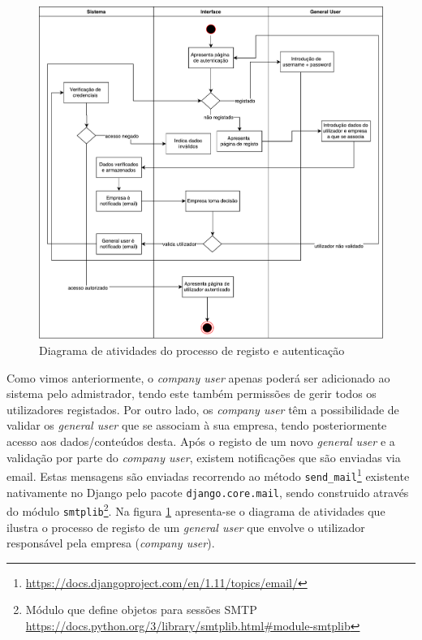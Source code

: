 \begin{figure}[!htb]
	\centering
	\includegraphics[width=\linewidth]{esquemas/activitydiagram-autenticacao.pdf}
	\caption{Diagrama de atividades do processo de registo e autenticação}
	\label{activt-autent}
\end{figure}


Como vimos anteriormente, o \textit{company user} apenas poderá ser adicionado ao sistema pelo admistrador, tendo este também permissões de gerir todos os utilizadores registados. Por outro lado, os \textit{company user} têm a possibilidade de validar os \textit{general user} que se associam à sua empresa, tendo posteriormente acesso aos dados/conteúdos desta. Após o registo de um novo \textit{general user} e a validação por parte do \textit{company user}, existem notificações que são enviadas via email. Estas mensagens são enviadas recorrendo ao método \texttt{send\_mail}\footnote{\url{https://docs.djangoproject.com/en/1.11/topics/email/}} existente nativamente no Django pelo pacote \texttt{django.core.mail}, sendo construido através do módulo \texttt{smtplib}\footnote{Módulo que define objetos para sessões \ac{SMTP} \url{https://docs.python.org/3/library/smtplib.html\#module-smtplib}}. Na figura \ref{activt-autent} apresenta-se o diagrama de atividades que ilustra o processo de registo de um \textit{general user} que envolve o utilizador responsável pela empresa (\textit{company user}). 


